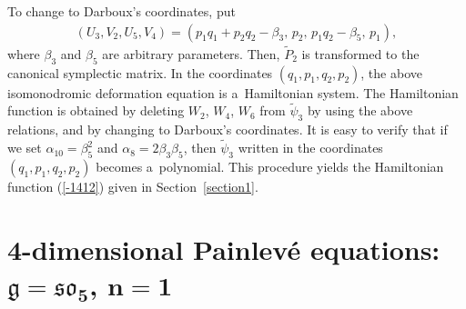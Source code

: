 \documentclass[10pt,a4paper]{amsart}
\numberwithin{equation}{section}
\begin{document}
To change to Darboux's coordinates, put
\begin{gather*}
(U_3, V_2 ,U_5, V_4) = (p_1q_1 + p_2q_2 - \beta_3,\, p_2,\, p_1q_2-\beta_5,\, p_1),
\end{gather*}
where $\beta_3$ and $\beta_5$ are arbitrary parameters. Then, $\widetilde{P}_2$ is transformed to the canonical symplectic matrix. In the coordinates $(q_1, p_1, q_2, p_2)$, the above isomonodromic deformation equation is a~Hamiltonian system. The Hamiltonian function is obtained by deleting $W_2$, $W_4$, $W_6$ from $\widetilde{\psi}_3$ by using the above relations, and by changing to Darboux's coordinates. It is easy to verify that if we set $\alpha _{10}=\beta_5^2$ and $\alpha _8 = 2\beta_3 \beta_5$, then $\widetilde{\psi}_3$ written in the coordinates $(q_1, p_1,q_2,p_2)$ becomes a~polynomial. This procedure yields the Hamiltonian function (\ref{-1412}) given in Section~\ref{section1}.

\section[4-dimensional Painlev\'{e} equations: $\mathfrak{g} = \mathfrak{so}_5$, $n=1$]{4-dimensional Painlev\'{e} equations: $\boldsymbol{\mathfrak{g} = \mathfrak{so}_5}$, $\boldsymbol{n=1}$}\label{section5}
\end{document}
